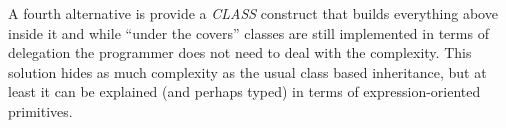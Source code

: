 \documentclass[preprint,10pt]{sigplanconf}
\begin{document}
A fourth alternative is provide a \textit{CLASS} construct that builds everything above inside it and while ``under the covers'' classes are still implemented in terms of delegation the programmer does not need to deal with the complexity. This solution hides as much complexity as the usual class based inheritance, but at least it can be explained (and perhaps typed) in terms of expression-oriented primitives.



%
%
%
%
\end{document}
